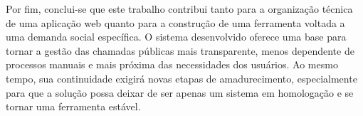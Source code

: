 Por fim, conclui-se que este trabalho contribui tanto para a organização técnica de uma aplicação web quanto para a construção de uma ferramenta voltada a uma demanda social específica. O sistema desenvolvido oferece uma base para tornar a gestão das chamadas públicas mais transparente, menos dependente de processos manuais e mais próxima das necessidades dos usuários. Ao mesmo tempo, sua continuidade exigirá novas etapas de amadurecimento, especialmente para que a solução possa deixar de ser apenas um sistema em homologação e se tornar uma ferramenta estável.
